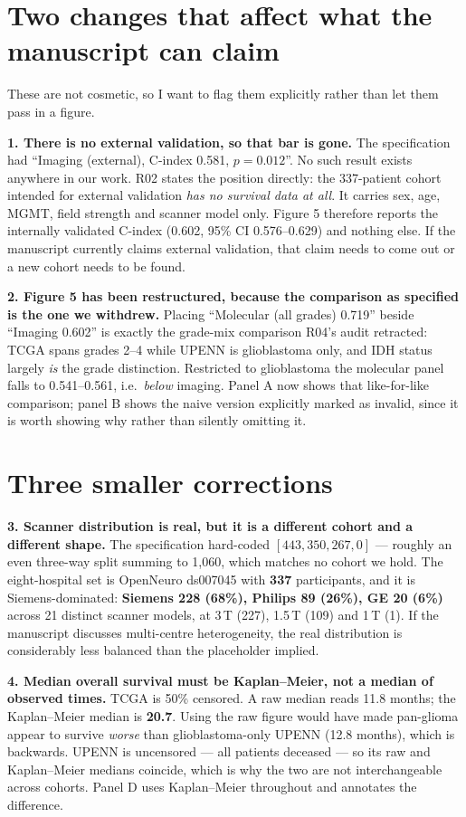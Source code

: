 \documentclass[11pt,a4paper]{article}
\begin{document}
\section{Two changes that affect what the manuscript can claim}

These are not cosmetic, so I want to flag them explicitly rather than let them pass in a figure.

\textbf{1. There is no external validation, so that bar is gone.} The specification had
``Imaging (external), C-index 0.581, $p = 0.012$''. No such result exists anywhere in our work.
R02 states the position directly: the 337-patient cohort intended for external validation
\emph{has no survival data at all}. It carries sex, age, MGMT, field strength and scanner model
only. Figure 5 therefore reports the internally validated C-index (0.602, 95\% CI 0.576--0.629)
and nothing else. If the manuscript currently claims external validation, that claim needs to
come out or a new cohort needs to be found.

\textbf{2. Figure 5 has been restructured, because the comparison as specified is the one we
withdrew.} Placing ``Molecular (all grades) 0.719'' beside ``Imaging 0.602'' is exactly the
grade-mix comparison R04's audit retracted: TCGA spans grades 2--4 while UPENN is glioblastoma
only, and IDH status largely \emph{is} the grade distinction. Restricted to glioblastoma the
molecular panel falls to 0.541--0.561, i.e.\ \emph{below} imaging. Panel A now shows that
like-for-like comparison; panel B shows the naive version explicitly marked as invalid, since it
is worth showing why rather than silently omitting it.

\section{Three smaller corrections}

\textbf{3. Scanner distribution is real, but it is a different cohort and a different shape.}
The specification hard-coded $[443, 350, 267, 0]$ --- roughly an even three-way split summing to
1{,}060, which matches no cohort we hold. The eight-hospital set is OpenNeuro ds007045 with
\textbf{337} participants, and it is Siemens-dominated: \textbf{Siemens 228 (68\%), Philips 89
(26\%), GE 20 (6\%)} across 21 distinct scanner models, at 3\,T (227), 1.5\,T (109) and 1\,T (1).
If the manuscript discusses multi-centre heterogeneity, the real distribution is considerably
less balanced than the placeholder implied.

\textbf{4. Median overall survival must be Kaplan--Meier, not a median of observed times.} TCGA
is 50\% censored. A raw median reads 11.8 months; the Kaplan--Meier median is \textbf{20.7}. Using
the raw figure would have made pan-glioma appear to survive \emph{worse} than glioblastoma-only
UPENN (12.8 months), which is backwards. UPENN is uncensored --- all patients deceased --- so its
raw and Kaplan--Meier medians coincide, which is why the two are not interchangeable across
cohorts. Panel D uses Kaplan--Meier throughout and annotates the difference.
\end{document}
